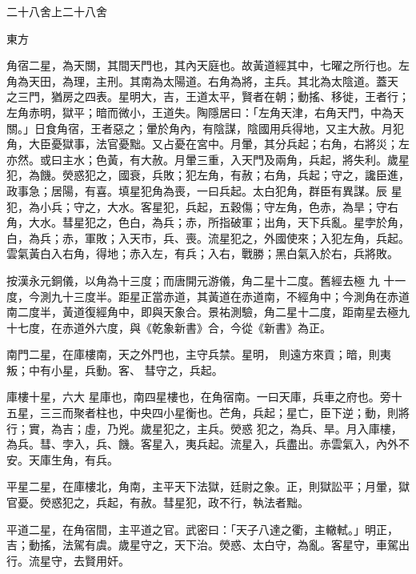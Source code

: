 
\begin{pinyinscope}

 二十八舍上二十八舍



 東方



 角宿二星，為天關，其間天門也，其內天庭也。故黃道經其中，七曜之所行也。左角為天田，為理，主刑。其南為太陽道。右角為將，主兵。其北為太陰道。蓋天
 之三門，猶房之四表。星明大，吉，王道太平，賢者在朝；動搖、移徙，王者行；左角赤明，獄平；暗而微小，王道失。陶隱居曰：「左角天津，右角天門，中為天關。」日食角宿，王者惡之；暈於角內，有陰謀，陰國用兵得地，又主大赦。月犯角，大臣憂獄事，法官憂黜。又占憂在宮中。月暈，其分兵起；右角，右將災；左亦然。或曰主水；色黃，有大赦。月暈三重，入天門及兩角，兵起，將失利。歲星犯，為饑。熒惑犯之，國衰，兵敗；犯左角，有赦；右角，兵起；守之，讒臣進，政事急；居陽，有喜。填星犯角為喪，一曰兵起。太白犯角，群臣有異謀。辰
 星犯，為小兵；守之，大水。客星犯，兵起，五穀傷；守左角，色赤，為旱；守右角，大水。彗星犯之，色白，為兵；赤，所指破軍；出角，天下兵亂。星孛於角，白，為兵；赤，軍敗；入天市，兵、喪。流星犯之，外國使來；入犯左角，兵起。雲氣黃白入右角，得地；赤入左，有兵；入右，戰勝；黑白氣入於右，兵將敗。



 按漢永元銅儀，以角為十三度；而唐開元游儀，角二星十二度。舊經去極
 九
 十一度，今測九十三度半。距星正當赤道，其黃道在赤道南，不經角中；今測角在赤道南二度半，黃道復經角中，即與天象合。景祐測驗，角二星十二度，距南星去極九十七度，在赤道外六度，與《乾象新書》合，今從《新書》為正。



 南門二星，在庫樓南，天之外門也，主守兵禁。星明，
 則遠方來貢；暗，則夷叛；中有小星，兵動。客、
 彗守之，兵起。



 庫樓十星，六大
 星庫也，南四星樓也，在角宿南。一曰天庫，兵車之府也。旁十五星，三三而聚者柱也，中央四小星衡也。芒角，兵起；星亡，臣下逆；動，則將行；實，為吉；虛，乃兇。歲星犯之，主兵。熒惑
 犯之，為兵、旱。月入庫樓，為兵。彗、孛入，兵、饑。客星入，夷兵起。流星入，兵盡出。赤雲氣入，內外不安。天庫生角，有兵。



 平星二星，在庫樓北，角南，主平天下法獄，廷尉之象。正，則獄訟平；月暈，獄官憂。熒惑犯之，兵起，有赦。彗星犯，政不行，執法者黜。



 平道二星，在角宿間，主平道之官。武密曰：「天子八達之衢，主轍軾。」明正，吉；動搖，法駕有虞。歲星守之，天下治。熒惑、太白守，為亂。客星守，車駕出行。流星守，去賢用奸。




\end{pinyinscope}
